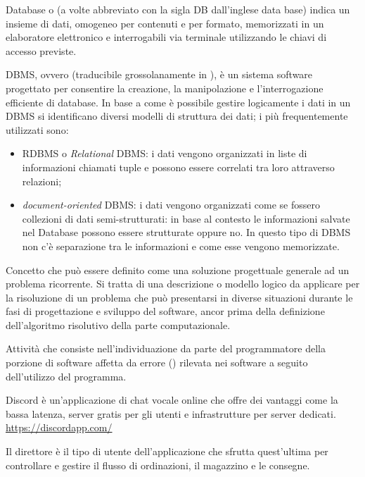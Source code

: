 
Database o  (a volte abbreviato con la sigla DB dall'inglese data base) indica un insieme di dati, omogeneo per contenuti e per formato, memorizzati in un elaboratore elettronico e interrogabili via terminale utilizzando le chiavi di accesso previste.

DBMS, ovvero  (traducibile grossolanamente in ), è un sistema software progettato per consentire la creazione, la manipolazione e l'interrogazione efficiente di database.
In base a come è possibile gestire logicamente i dati in un DBMS si identificano diversi modelli di struttura dei dati; i più frequentemente utilizzati sono:
\begin{itemize}
    \item RDBMS o \textit{Relational} DBMS: i dati vengono organizzati in liste di informazioni chiamati tuple e possono essere correlati tra loro attraverso relazioni;
    \item \textit{document-oriented} DBMS: i dati vengono organizzati come se fossero collezioni di dati semi-strutturati: in base al contesto le informazioni salvate nel Database possono essere strutturate oppure no. In questo tipo di DBMS non c'è separazione tra le informazioni e come esse vengono memorizzate.
\end{itemize}

Concetto che può essere definito come una soluzione progettuale generale ad un problema ricorrente. Si tratta di una descrizione o modello logico da applicare per la risoluzione di un problema che può presentarsi in diverse situazioni durante le fasi di progettazione e sviluppo del software, ancor prima della definizione dell'algoritmo risolutivo della parte computazionale.

Attività che consiste nell'individuazione da parte del programmatore della porzione di software affetta da errore () rilevata nei software a seguito dell'utilizzo del programma.

Discord è un’applicazione di chat vocale online che offre dei vantaggi come la bassa latenza, server gratis per gli utenti e infrastrutture per server dedicati.\\
\url{https://discordapp.com/}

Il direttore è il tipo di utente dell’applicazione che sfrutta quest’ultima per controllare e gestire il flusso di ordinazioni, il magazzino e le consegne.

